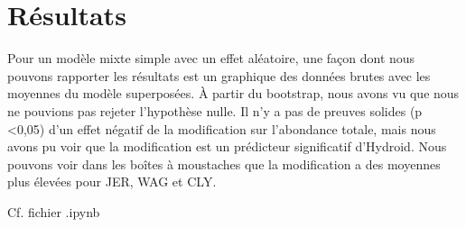 \documentclass{article}
\theoremstyle{definition}
\begin{document}
\newpage

\section{Résultats}

Pour un modèle mixte simple avec un effet aléatoire, une façon dont nous pouvons rapporter les résultats est un graphique des données brutes avec les moyennes du modèle superposées. À partir du bootstrap, nous avons vu que nous ne pouvions pas rejeter l'hypothèse nulle. Il n'y a pas de preuves solides (p <0,05) d'un effet négatif de la modification sur l'abondance totale, mais nous avons pu voir que la modification est un prédicteur significatif d'Hydroid. Nous pouvons voir dans les boîtes à moustaches que la modification a des moyennes plus élevées pour JER, WAG et CLY.


Cf. fichier .ipynb
\end{document}
